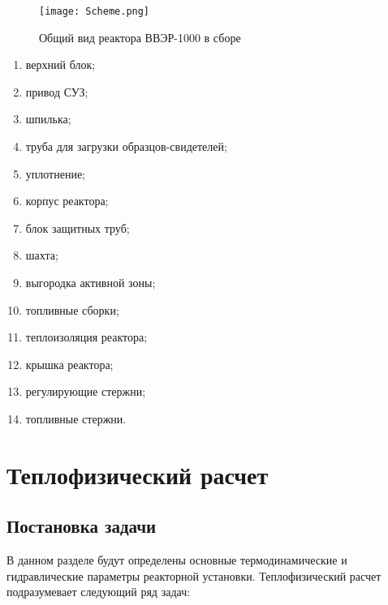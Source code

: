 %
\noindent
\begin{minipage}[t]{.5\textwidth}
\raggedright
\cite{лескин2011физические}
\begin{figure}[H]
	\begin{center}
		\texttt{[image: Scheme.png]}
		\caption{\small Общий вид реактора ВВЭР-1000 в сборе }
		\label{pic:scheme} %
	\end{center}
\end{figure}
%
\end{minipage}%
\begin{minipage}[t]{.5\textwidth}
\raggedright
\begin{enumerate}
\item верхний блок; 
\item привод СУЗ;
\item шпилька;
\item труба для загрузки образцов-свидетелей;
\item уплотнение;
\item корпус реактора;
\item блок защитных труб;
\item шахта;
\item выгородка активной зоны;
\item топливные сборки;
\item теплоизоляция реактора; 
\item крышка реактора;
\item регулирующие стержни;
\item топливные стержни.
\end{enumerate}
\end{minipage}

\section{Теплофизический расчет}

\subsection{Постановка задачи}
В данном разделе будут определены основные термодинамические и гидравлические параметры реакторной установки. Теплофизический расчет подразумевает следующий ряд задач:

